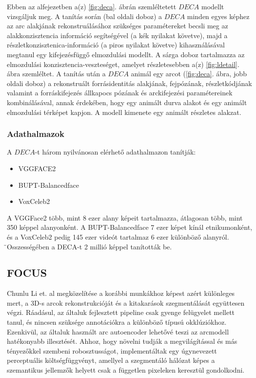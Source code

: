 \documentclass[12pt,a4]{article}
\begin{document}
 	Ebben az alfejezetben a(z) \ref{fig:deca}. ábrán szemléltetett $DECA$ modellt
 	vizsgáljuk meg.
 	A tanítás során (bal oldali doboz) a $DECA$ minden egyes képhez
 	az arc alakjának rekonstruálásához szükséges paramétereket becsli meg az
 	alakkonzisztencia információ segítségével (a kék nyilakat követve), majd
 	a részletkonzisztenica-információ (a piros nyilakat követve) kihasználásával
 	megtanul egy kifejezésfüggő elmozdulási modellt. A sárga doboz tartalmazza
 	az elmozdulási konzisztencia-veszteséget, amelyet részletesebben a(z) \ref{fig:ldetail}. ábra
 	szemléltet.
 	A tanítás után a $DECA$ animál egy arcot (\ref{fig:deca}. ábra, jobb oldali doboz)
 	a rekonstruált forrásidentitás alakjának, fejpózának, részletkódjának
 	valamint a forráskifejezés állkapocs pózának és arckifejezési paramétereinek
 	kombinálásával, annak érdekében, hogy egy animált durva alakot és egy
 	animált elmozdulási térképet kapjon. A modell kimenete egy animált
 	részletes alakzat.
 	
 	\subsubsection{Adathalmazok}
 	
 	A $DECA$-t három nyilvánosan elérhető adathalmazon tanítják:
 	\begin{itemize}
 		\item VGGFACE2
 		\item BUPT-Balancedface
 		\item VoxCeleb2
 	\end{itemize}
 
 	A VGGFace2 több, mint 8 ezer alany képeit tartalmazza, átlagosan több,
 	mint 350 képpel alanyonként. A BUPT-Balancedface 7 ezer képet kínál
 	etnikumonként, és a VoxCeleb2 pedig 145 ezer videót tartalmaz 6 ezer
 	különböző alanyról.  ̈Osszességében a DECA-t 2 millió képpel tanították
 	be.
 	
 	\subsection{FOCUS}
 	
 	Chunlu Li et. al \cite{focus} megközelítése a korábbi munkákhoz képest azért
 	különleges mert, a 3D-s arcok rekonstrukcióját és a kitakarások szegmentálását
 	együttesen végzi. Ráadásul, az általuk fejlesztett pipeline csak gyenge felügyelet mellett tanul, és nincsen szüksége annotációkra a különböző típusú
 	okklúziókhoz.
 	Ezenkivül, az általuk használt arc autoencoder lehetővé teszi az arcmodell hatékonyabb illesztését. Ahhoz, hogy növelni tudják a megvilágítással és
 	más tényezőkkel szembeni robosztusságot, implementáltak egy úgynevezett
 	perceptuális költségfüggvényt, amellyel a szegmentáló hálózat képes a szemantikus jellemzők helyett csak a független pixeleken keresztül gondolkodni.
 	
\end{document}
